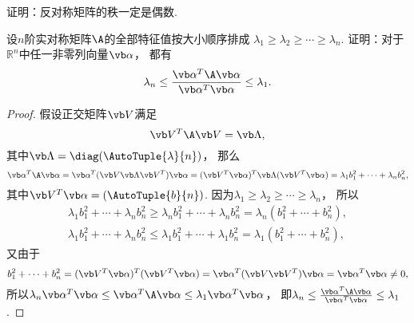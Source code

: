 \begin{example}
证明：反对称矩阵的秩一定是偶数.
\end{example}
\begin{example}\label{example:二次型.瑞利商的取值范围}
设\(n\)阶实对称矩阵\(\A\)的全部特征值按大小顺序排成
\(\lambda_1 \geq \lambda_2 \geq \dotsb \geq \lambda_n\).
证明：对于\(\mathbb{R}^n\)中任一非零列向量\(\vb\alpha\)，
都有\begin{equation*}
	\lambda_n \leq \frac{\vb\alpha^T \A \vb\alpha}{\vb\alpha^T \vb\alpha} \leq \lambda_1.
\end{equation*}
\begin{proof}
假设正交矩阵\(\Q\)满足\begin{equation*}
	\Q^T \A \Q = \vb\Lambda,
\end{equation*}
其中\(\vb\Lambda = \diag(\AutoTuple{\lambda}{n})\)，
那么\begin{equation*}
	\vb\alpha^T \A \vb\alpha
	= \vb\alpha^T (\Q \vb\Lambda \Q^T) \vb\alpha
	= (\Q^T \vb\alpha)^T \vb\Lambda (\Q^T \vb\alpha)
	= \lambda_1 b_1^2 + \dotsb + \lambda_n b_n^2,
\end{equation*}
其中\(\Q^T \vb\alpha = (\AutoTuple{b}{n})\).
因为\(\lambda_1 \geq \lambda_2 \geq \dotsb \geq \lambda_n\)，
所以\begin{gather*}
	\lambda_1 b_1^2 + \dotsb + \lambda_n b_n^2
	\geq \lambda_n b_1^2 + \dotsb + \lambda_n b_n^2
	= \lambda_n (b_1^2 + \dotsb + b_n^2), \\
	\lambda_1 b_1^2 + \dotsb + \lambda_n b_n^2
	\leq \lambda_1 b_1^2 + \dotsb + \lambda_1 b_n^2
	= \lambda_1 (b_1^2 + \dotsb + b_n^2),
\end{gather*}
又由于\begin{equation*}
	b_1^2 + \dotsb + b_n^2
	= (\Q^T \vb\alpha)^T (\Q^T \vb\alpha)
	= \vb\alpha^T (\Q \Q^T) \vb\alpha
	= \vb\alpha^T \vb\alpha
	\neq 0,
\end{equation*}
所以\(\lambda_n \vb\alpha^T \vb\alpha
\leq \vb\alpha^T \A \vb\alpha
\leq \lambda_1 \vb\alpha^T \vb\alpha\)，
即\(\lambda_n \leq \frac{\vb\alpha^T \A \vb\alpha}{\vb\alpha^T \vb\alpha} \leq \lambda_1\).
\end{proof}
\end{example}
